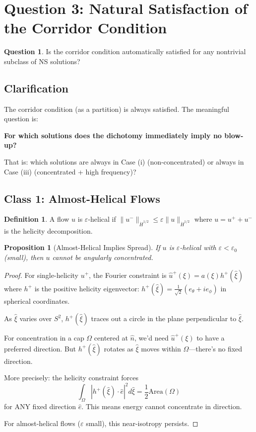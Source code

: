 \documentclass[11pt]{article}
\newtheorem{proposition}[theorem]{Proposition}
\theoremstyle{definition}
\newtheorem{definition}[theorem]{Definition}
\newtheorem{question}{Question}
\begin{document}
\section{Question 3: Natural Satisfaction of the Corridor Condition}

\begin{question}
Is the corridor condition automatically satisfied for any nontrivial subclass of NS solutions?
\end{question}

\subsection{Clarification}

The corridor condition (as a partition) is always satisfied. The meaningful question is:

\textbf{For which solutions does the dichotomy immediately imply no blow-up?}

That is: which solutions are always in Case (i) (non-concentrated) or always in Case (iii) (concentrated + high frequency)?

\subsection{Class 1: Almost-Helical Flows}

\begin{definition}
A flow $u$ is $\varepsilon$-helical if $\|u^-\|_{\dot{H}^{1/2}} \leq \varepsilon\|u\|_{\dot{H}^{1/2}}$ where $u = u^+ + u^-$ is the helicity decomposition.
\end{definition}

\begin{proposition}[Almost-Helical Implies Spread]\label{prop:helical-spread}
If $u$ is $\varepsilon$-helical with $\varepsilon < \varepsilon_0$ (small), then $u$ cannot be angularly concentrated.
\end{proposition}

\begin{proof}
For single-helicity $u^+$, the Fourier constraint is $\hat{u}^+(\xi) = a(\xi) h^+(\hat{\xi})$ where $h^+$ is the positive helicity eigenvector: $h^+(\hat{\xi}) = \frac{1}{\sqrt{2}}(e_\theta + ie_\phi)$ in spherical coordinates.

As $\hat{\xi}$ varies over $S^2$, $h^+(\hat{\xi})$ traces out a circle in the plane perpendicular to $\hat{\xi}$.

For concentration in a cap $\Omega$ centered at $\hat{n}$, we'd need $\hat{u}^+(\xi)$ to have a preferred direction. But $h^+(\hat{\xi})$ rotates as $\hat{\xi}$ moves within $\Omega$---there's no fixed direction.

More precisely: the helicity constraint forces
\[
\int_\Omega |h^+(\hat{\xi}) \cdot \hat{e}|^2 d\hat{\xi} = \frac{1}{2}\text{Area}(\Omega)
\]
for ANY fixed direction $\hat{e}$. This means energy cannot concentrate in direction.

For almost-helical flows ($\varepsilon$ small), this near-isotropy persists.
\end{proof}
\end{document}
